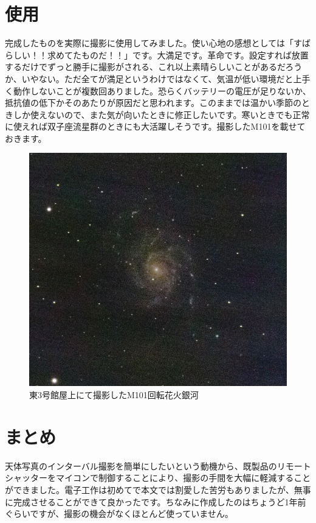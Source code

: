 \documentclass[../main]{subfiles}
\begin{document}
\section{使用}
完成したものを実際に撮影に使用してみました。使い心地の感想としては「すばらしい！！求めてたものだ！！」です。大満足です。革命です。設定すれば放置するだけでずっと勝手に撮影がされる、これ以上素晴らしいことがあるだろうか、いやない。ただ全てが満足というわけではなくて、気温が低い環境だと上手く動作しないことが複数回ありました。恐らくバッテリーの電圧が足りないか、抵抗値の低下かそのあたりが原因だと思われます。このままでは温かい季節のときしか使えないので、また気が向いたときに修正したいです。寒いときでも正常に使えれば双子座流星群のときにも大活躍しそうです。撮影したM101を載せておきます。
\begin{figure}[H]
    \centering
    \includegraphics[width=0.8\linewidth]{sections/Maruyama/figure/M101_0529_4.jpg}
    \caption{東3号館屋上にて撮影したM101回転花火銀河}
\end{figure}


\section{まとめ}
天体写真のインターバル撮影を簡単にしたいという動機から、既製品のリモートシャッターをマイコンで制御することにより、撮影の手間を大幅に軽減することができました。電子工作は初めてで本文では割愛した苦労もありましたが、無事に完成させることができて良かったです。ちなみに作成したのはちょうど1年前ぐらいですが、撮影の機会がなくほとんど使っていません。

\end{document}
